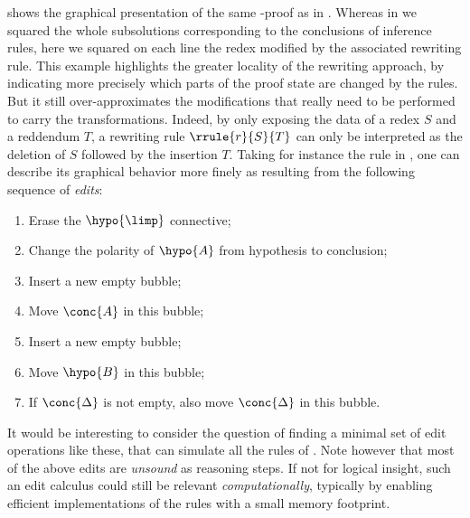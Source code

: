 

 shows the graphical presentation of the same -proof
as in . Whereas in  we squared the whole
subsolutions corresponding to the conclusions of inference rules, here we
squared on each line the redex modified by the associated rewriting rule. This
example highlights the greater locality of the rewriting approach, by indicating
more precisely which parts of the proof state are changed by the rules. But it
still over-approximates the modifications that really need to be performed to
carry the transformations. Indeed, by only exposing the data of a redex $S$ and
a reddendum $T$, a rewriting rule $\rrule{r}{S}{T}$ can only be
interpreted as the deletion of $S$ followed by the insertion $T$. Taking for
instance the {\rnmsf{{\limp}{-}}} rule in , one can
describe its graphical behavior more finely as resulting from the following
sequence of \emph{edits}:
\begin{enumerate}
  \item Erase the $\hypo{{\limp}}$ connective;
  \item Change the polarity of $\hypo{A}$ from hypothesis to conclusion;
  \item Insert a new empty bubble;
  \item Move $\conc{A}$ in this bubble;
  \item Insert a new empty bubble;
  \item Move $\hypo{B}$ in this bubble;
  \item If $\conc{\Delta}$ is not empty, also move $\conc{\Delta}$ in this bubble.
\end{enumerate}
It would be interesting to consider the question of finding a minimal set of
edit operations like these, that can simulate all the rules of
. Note however that most of the above edits are
\emph{unsound} as reasoning steps. If not for logical insight, such an edit
calculus could still be relevant \emph{computationally}, typically by enabling
efficient implementations of the rules with a small memory footprint.

